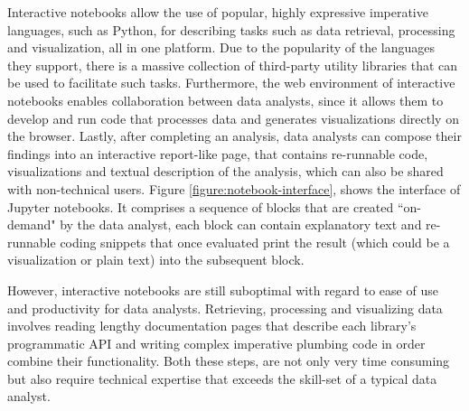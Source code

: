 Interactive notebooks allow the use of popular, highly expressive imperative languages, such as Python, for describing tasks such as data retrieval, processing and visualization, all in one platform. Due to the popularity of the languages they support, there is a massive collection of third-party utility libraries that can be used to facilitate such tasks. Furthermore, the web environment of interactive notebooks enables collaboration between data analysts, since it allows them to develop and run code that processes data and generates visualizations directly on the browser. Lastly, after completing an analysis, data analysts can compose their findings into an interactive report-like page, that contains re-runnable code, visualizations and textual description of the analysis, which can also be shared with non-technical users. Figure \ref{figure:notebook-interface}, shows the interface of Jupyter notebooks. It comprises a sequence of blocks that are created ``on-demand" by the data analyst, each block can contain explanatory text and re-runnable coding snippets that once evaluated print the result (which could be a visualization or plain text) into the subsequent block. 



However, interactive notebooks are still suboptimal with regard to ease of use and productivity for data analysts. Retrieving, processing and visualizing data involves reading lengthy documentation pages that describe each library's programmatic API and writing complex imperative plumbing code in order combine their functionality. Both these steps, are not only very time consuming but also require technical expertise that exceeds the skill-set of a typical data analyst. 



